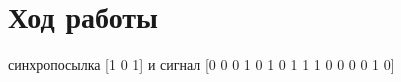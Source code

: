 \documentclass[a4paper,12pt]{article}
\begin{document}
\section{Ход работы}
\begin{enumerate}
{ синхропосылка [1 0 1] и сигнал [0 0 0 1 0 1 0 1 1 1 0 0 0 0 1 0]
\\}


\end{enumerate}
\end{document}
